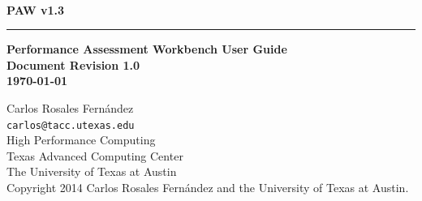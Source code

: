 \documentclass[10pt,a4paper]{report}
\begin{document}
\begin{titlepage}
\thispagestyle{empty}	%
\verb+ +
\vspace{1em}
\begin{flushright}
\huge\bf PAW v1.3\\
\rule{\textwidth}{4pt}
\large{\bf Performance Assessment Workbench User Guide\\
Document Revision 1.0\\
\today}
\end{flushright}

\newpage
\thispagestyle{empty}
\begin{flushleft}
Carlos Rosales Fern\'andez\\
\verb+carlos@tacc.utexas.edu+\\
\vspace{0.5em}
High Performance Computing \\
Texas Advanced Computing Center\\
The University of Texas at Austin\\
\vspace{1cm}
Copyright 2014 Carlos Rosales Fern\'andez and the University of Texas at Austin.
\end{flushleft}
\newpage
\end{titlepage}
\end{document}
